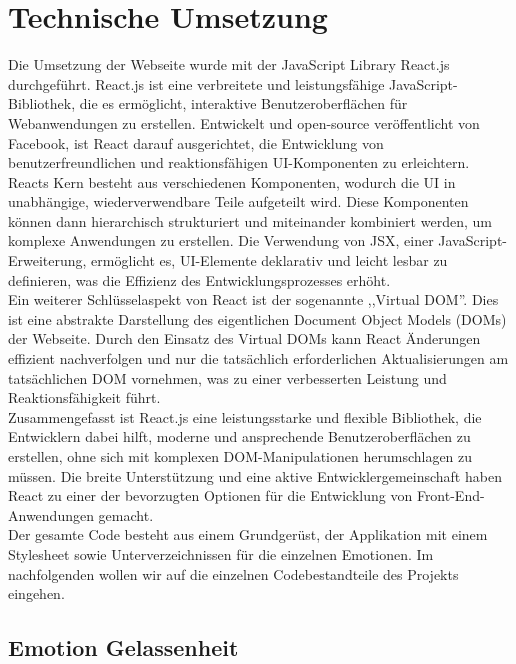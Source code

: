 \documentclass[./dokumentation.tex]{subfiles}
\begin{document}
\chapter{Technische Umsetzung}
Die Umsetzung der Webseite wurde mit der JavaScript Library React.js durchgeführt.  React.js ist eine verbreitete und leistungsfähige JavaScript-Bibliothek, die es ermöglicht, interaktive Benutzeroberflächen für Webanwendungen zu erstellen. Entwickelt und open-source veröffentlicht von Facebook, ist React darauf ausgerichtet, die Entwicklung von benutzerfreundlichen und reaktionsfähigen UI-Komponenten zu erleichtern.\\

Reacts Kern besteht aus verschiedenen Komponenten, wodurch die UI in unabhängige, wiederverwendbare Teile aufgeteilt wird. Diese Komponenten können dann hierarchisch strukturiert und miteinander kombiniert werden, um komplexe Anwendungen zu erstellen. Die Verwendung von JSX, einer JavaScript-Erweiterung, ermöglicht es, UI-Elemente deklarativ und leicht lesbar zu definieren, was die Effizienz des Entwicklungsprozesses erhöht.\\

Ein weiterer Schlüsselaspekt von React ist der sogenannte ,,Virtual DOM''. Dies ist eine abstrakte Darstellung des eigentlichen Document Object Models (DOMs) der Webseite. Durch den Einsatz des Virtual DOMs kann React Änderungen effizient nachverfolgen und nur die tatsächlich erforderlichen Aktualisierungen am tatsächlichen DOM vornehmen, was zu einer verbesserten Leistung und Reaktionsfähigkeit führt.\\

Zusammengefasst ist React.js eine leistungsstarke und flexible Bibliothek, die Entwicklern dabei hilft, moderne und ansprechende Benutzeroberflächen zu erstellen, ohne sich mit komplexen DOM-Manipulationen herumschlagen zu müssen. Die breite Unterstützung und eine aktive Entwicklergemeinschaft haben React zu einer der bevorzugten Optionen für die Entwicklung von Front-End-Anwendungen gemacht.\\

Der gesamte Code besteht aus einem Grundgerüst, der Applikation mit einem Stylesheet sowie Unterverzeichnissen für die einzelnen Emotionen. Im nachfolgenden wollen wir auf die einzelnen Codebestandteile des Projekts eingehen. 

\section{Emotion Gelassenheit}
\end{document}
